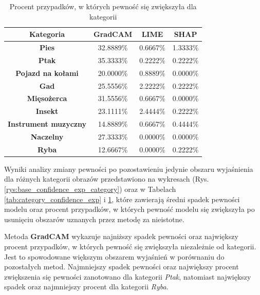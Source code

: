 \begin{table}[h]
	\centering
	\begin{tabular}{|c|c|c|c|}
		\hline
		\textbf{Kategoria}           & \textbf{GradCAM} & \textbf{LIME} & \textbf{SHAP} \\
		\hline
		\textbf{Pies}                & 32.8889\%        & 0.6667\%      & 1.3333\%      \\
		\hline
		\textbf{Ptak}                & 35.3333\%        & 0.2222\%      & 0.2222\%      \\
		\hline
		\textbf{Pojazd na kołami}    & 20.0000\%        & 0.8889\%      & 0.0000\%      \\
		\hline
		\textbf{Gad}                 & 25.5556\%        & 2.2222\%      & 0.2222\%      \\
		\hline
		\textbf{Mięsożerca}          & 31.5556\%        & 0.6667\%      & 0.0000\%      \\
		\hline
		\textbf{Insekt}              & 23.1111\%        & 2.4444\%      & 0.2222\%      \\
		\hline
		\textbf{Instrument muzyczny} & 14.8889\%        & 0.6667\%      & 0.4444\%      \\
		\hline
		\textbf{Naczelny}            & 27.3333\%        & 0.0000\%      & 0.0000\%      \\
		\hline
		\textbf{Ryba}                & 12.6667\%        & 0.0000\%      & 0.2222\%      \\
		\hline
	\end{tabular}
	\caption{Procent przypadków, w których pewność się zwiększyła dla kategorii}
	\label{tab:category_confidence_exp_percent}
\end{table}

Wyniki analizy zmiany pewności po pozostawieniu jedynie obszaru wyjaśnienia dla różnych kategorii obrazów przedstawiono na wykresach (Rys. \ref{rys:base_confidence_exp_category}) oraz w Tabelach \ref{tab:category_confidence_exp} i \ref{tab:category_confidence_exp_percent}, które zawierają średni spadek pewności modelu oraz procent przypadków, w których pewność modelu się zwiększyła po usunięciu obszarów uznanych przez metodę za nieistotne.

Metoda \textbf{GradCAM} wykazuje najniższy spadek pewności oraz największy procent przypadków, w których pewność się zwiększyła niezależnie od kategorii.
Jest to spowodowane większym obszarem wyjaśnień w porównaniu do pozostałych metod.
Najmniejszy spadek pewności oraz największy procent zwiększenia się pewności zanotowano dla kategorii \textit{Ptak}, natomiast największy spadek oraz najmniejszy procent dla kategorii \textit{Ryba}.

